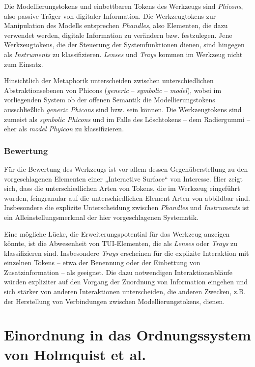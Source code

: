 Die Modellierungstokens und einbettbaren Tokens des Werkzeugs sind \emph{Phicons}, also passive Träger von digitaler Information. Die Werkzeugtokens zur Manipulation des Modells entsprechen \emph{Phandles}, also Elementen, die dazu verwendet werden, digitale Information zu verändern bzw. festzulegen. Jene Werkzeugtokens, die der Steuerung der Systemfunktionen dienen, sind hingegen als \emph{Instruments} zu klassifizieren. \emph{Lenses} und \emph{Trays} kommen im Werkzeug nicht zum Einsatz.

Hinsichtlich der Metaphorik unterscheiden \citet{Ullmer97} zwischen unterschiedlichen Abstraktionsebenen von Phicons (\emph{generic} -- \emph{symbolic} -- \emph{model}), wobei im vorliegenden System ob der offenen Semantik die Modellierungstokens ausschließlich \emph{generic Phicons} sind bzw. sein können. Die Werkzeugtokens sind zumeist als \emph{symbolic Phicons} und im Falle des Löschtokens -- dem Radiergummi -- eher als \emph{model Phyicon} zu klassifizieren.

\subsubsection{Bewertung} 

Für die Bewertung des Werkzeugs ist vor allem dessen Gegenüberstellung zu den vorgeschlagenen Elementen einer „Interactive Surface“ von Interesse. Hier zeigt sich, dass die unterschiedlichen Arten von Tokens, die im Werkzeug eingeführt wurden, feingranular auf die unterschiedlichen Element-Arten von \citet{Ishii97} abbildbar sind. Insbesondere die explizite Unterscheidung zwischen \emph{Phandles} und \emph{Instruments} ist ein Alleinstellungsmerkmal der hier vorgeschlagenen Systematik.

Eine mögliche Lücke, die Erweiterungspotential für das Werkzeug anzeigen könnte, ist die Abwesenheit von TUI-Elementen, die als \emph{Lenses} oder \emph{Trays} zu klassifizieren sind. Insbesondere \emph{Trays} erscheinen für die explizite Interaktion mit einzelnen Tokens -- etwa der Benennung oder der Einbettung von Zusatzinformation -- als geeignet. Die dazu notwendigen Interaktionsabläufe würden expliziter auf den Vorgang der Zuordnung von Information eingehen und sich stärker von anderen Interaktionen unterscheiden, die anderen Zwecken, z.B. der Herstellung von Verbindungen zwischen Modellierungstokens, dienen.


\section{Einordnung in das Ordnungssystem von Holmquist et al.} %
\label{sec:einordnung_in_das_ordnungssystem_von_holmquist_et_al_}


